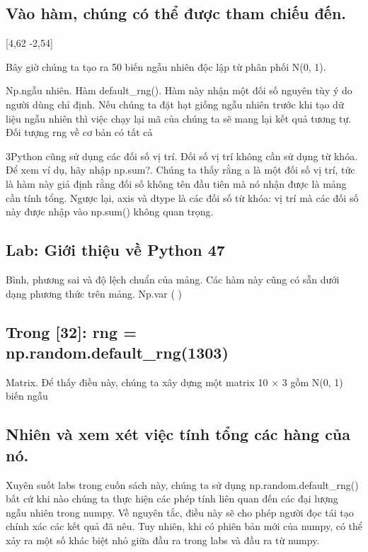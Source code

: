 \subsection{Vào hàm, chúng có thể được tham chiếu đến.}

[4,62 -2,54]

Bây giờ chúng ta tạo ra 50 biến ngẫu nhiên độc lập từ phân phối N(0, 1).

Np.ngẫu nhiên. Hàm default\_rng(). Hàm này nhận một đối số nguyên tùy ý do người dùng chỉ định. Nếu chúng ta đặt hạt giống ngẫu nhiên trước khi tạo dữ liệu ngẫu nhiên thì việc chạy lại mã của chúng ta sẽ mang lại kết quả tương tự. Đối tượng rng về cơ bản có tất cả

3Python cũng sử dụng các đối số vị trí. Đối số vị trí không cần sử dụng từ khóa. Để xem ví dụ, hãy nhập np.sum?. Chúng ta thấy rằng a là một đối số vị trí, tức là hàm này giả định rằng đối số không tên đầu tiên mà nó nhận được là mảng cần tính tổng. Ngược lại, axis và dtype là các đối số từ khóa: vị trí mà các đối số này được nhập vào np.sum() không quan trọng.

\subsection{Lab: Giới thiệu về Python 47}

Bình, phương sai và độ lệch chuẩn của mảng. Các hàm này cũng có sẵn dưới dạng phương thức trên mảng. Np.var ( )

\subsection{Trong [32]: rng = np.random.default\_rng(1303)}

Matrix. Để thấy điều này, chúng ta xây dựng một matrix 10 × 3 gồm N(0, 1) biến ngẫu

\subsection{Nhiên và xem xét việc tính tổng các hàng của nó.}

Xuyên suốt labs trong cuốn sách này, chúng ta sử dụng np.random.default\_rng() bất cứ khi nào chúng ta thực hiện các phép tính liên quan đến các đại lượng ngẫu nhiên trong numpy. Về nguyên tắc, điều này sẽ cho phép người đọc tái tạo chính xác các kết quả đã nêu. Tuy nhiên, khi có phiên bản mới của numpy, có thể xảy ra một số khác biệt nhỏ giữa đầu ra trong labs và đầu ra từ numpy.

